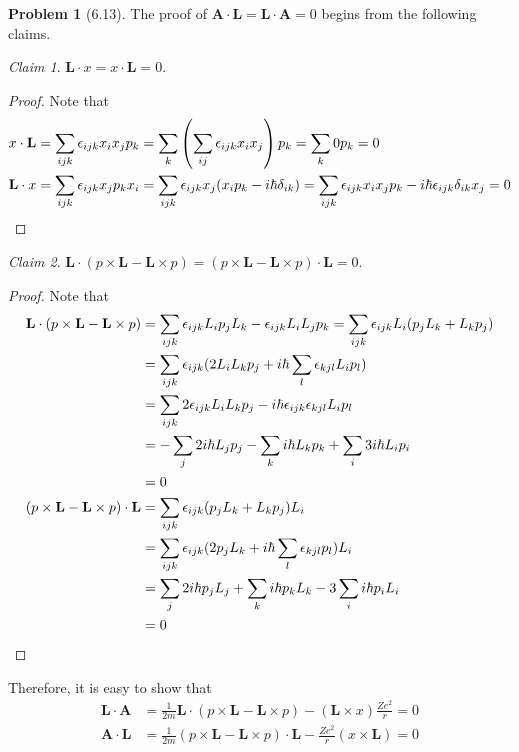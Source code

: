 \documentclass[twoside,11pt]{article}
\theoremstyle{definition}
\newtheorem{problem}{Problem}
\theoremstyle{remark}
\newtheorem*{claim}{Claim}
\begin{document}
\begin{problem}[6.13]
The proof of $\mathbf{A}\cdot\mathbf{L} = \mathbf{L}\cdot\mathbf{A}=0$
begins from the following claims.
\begin{claim}
    $\mathbf{L}\cdot x = x\cdot \mathbf{L} = 0$.
\end{claim}
\begin{proof}
    Note that
    \begin{align*}
        x\cdot\mathbf{L} &= \sum_{ijk}\epsilon_{ijk}x_ix_jp_k = \sum_k \left(\sum_{ij}\epsilon_{ijk}x_ix_j\right)p_k
        = \sum_k 0p_k = 0\\
        \mathbf{L}\cdot x &= \sum_{ijk}\epsilon_{ijk}x_jp_kx_i = 
        \sum_{ijk}\epsilon_{ijk}x_j(x_ip_k-i\hbar\delta_{ik}) =
        \sum_{ijk}\epsilon_{ijk} x_ix_jp_k-i\hbar\epsilon_{ijk}\delta_{ik}x_j = 0
        \qedhere
    \end{align*}
\end{proof}
\begin{claim}
    $\mathbf{L}\cdot (p\times\mathbf{L} - \mathbf{L}\times p) = 
    (p\times \mathbf{L} - \mathbf{L}\times p)\cdot \mathbf{L} = 0$.
\end{claim}
\begin{proof}
    Note that
    \begin{align*}
        \mathbf{L}\cdot (p\times\mathbf{L} - \mathbf{L}\times p) &= 
        \sum_{ijk}\epsilon_{ijk}L_ip_jL_k - \epsilon_{ijk}L_iL_jp_k
        =\sum_{ijk}\epsilon_{ijk}L_i(p_jL_k + L_kp_j)\\
        &= \sum_{ijk}\epsilon_{ijk}(2L_iL_kp_j + i\hbar\sum_{l}\epsilon_{kjl}L_ip_l)\\
        &= \sum_{ijk}2\epsilon_{ijk}L_iL_kp_j - i\hbar\epsilon_{ijk}\epsilon_{kjl}L_ip_l\\
        &= -\sum_j 2i\hbar L_jp_j - \sum_ki\hbar L_kp_k + \sum_i 3i\hbar L_ip_i\\
        &= 0\\
        (p\times\mathbf{L} - \mathbf{L}\times p)\cdot\mathbf{L} &=
        \sum_{ijk}\epsilon_{ijk}(p_jL_k+L_kp_j)L_i\\
        &= \sum_{ijk}\epsilon_{ijk}(2p_jL_k + i\hbar\sum_l\epsilon_{kjl}p_l)L_i\\
        &= \sum_j 2i\hbar p_j L_j + \sum_ki\hbar p_k L_k - 3\sum_i i\hbar p_iL_i\\
        &= 0\qedhere
    \end{align*}
\end{proof}
Therefore, it is easy to show that
\begin{align*}
    \mathbf{L}\cdot\mathbf{A} &= \frac{1}{2m}\mathbf{L}\cdot(p\times\mathbf{L}
    -\mathbf{L}\times p) - (\mathbf{L}\times x)\frac{Ze^2}{r} = 0\\
    \mathbf{A}\cdot\mathbf{L} &= \frac{1}{2m}(p\times\mathbf{L}-\mathbf{L}\times p)\cdot\mathbf{L}
    - \frac{Ze^2}{r}(x\times\mathbf{L}) = 0
\end{align*}

\end{problem}
\end{document}
